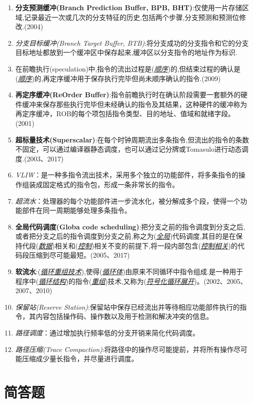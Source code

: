 \documentclass[a4paper]{ctexbook}
\newcommand{\blank}[1]{(\emph{\underline{#1}})}
\begin{document}
\begin{enumerate}
  \item \textbf{分支预测缓冲(Branch Prediction Buffer, BPB, BHT)}:仅使用一片存储区域,记录最近一次或几次的分支特征的历史,包括两个步骤,分支预测和预测位修改.(2004)
  \item \emph{分支目标缓冲(Branch Target Buffer, BTB)}:将分支成功的分支指令和它的分支目标地址都放到一个缓冲区中保存起来,缓冲区以分支指令的地址作为标识.
  \item 在前瞻执行(speculation)中,指令的流出过程是\blank{顺序}的,但结束过程的确认是\blank{顺序}的,再定序缓冲用于保存执行完毕但尚未顺序确认的指令.(2009)
  \item \textbf{再定序缓冲(ReOrder Buffer)}:指令前瞻执行时在确认阶段需要一套额外的硬件缓冲来保存那些执行完毕但未经确认的指令及其结果，这种硬件的缓冲称为再定序缓冲，ROB的每个项包括指令类型、目的地址、值域和就绪字段。(2001)
  \item \textbf{超标量技术(Superscalar)}:在每个时钟周期流出多条指令,但流出的指令的条数不固定，可以通过编译器静态调度，也可以通过记分牌或Tomasulo进行动态调度.(2003、2017)
  \item \emph{VLIW}：是一种多指令流出技术，采用多个独立的功能部件，将多条指令的操作组装成固定格式的指令包，形成一条非常长的指令。
  \item \emph{超流水}：处理器的每个功能部件进一步流水化，被分解成多个段，使得一个功能部件在同一周期能够处理多条指令。
  \item \textbf{全局代码调度(Globa code scheduling)}:把分支之前的指令调度到分支之后,或者把分支之后的指令调度到分支之前,称之为(\emph{\underline{全局}})代码调度,其目的是在保持代段\blank{数据}相关和\blank{控制}相关不变的前提下,将一段内部包含\blank{控制相关}的代码段压缩到尽可能最短。(2005、2017)
  \item \textbf{软流水}:\blank{循环重组技术},使得\blank{循环体}由原来不同循环中指令组成.是一种用于程序中\blank{循环结构}的指令\blank{重组}技术,又称为\blank{符号化循环展开}。(2002、2005、2007、2010)
  \item \emph{保留站(Reserve Station)}:保留站中保存已经流出并等待相应功能部件执行的指令，其内容包括操作码、操作数以及用于检测和解决冲突的信息。
  \item \emph{路径调度}：通过增加执行频率低的分支开销来简化代码调度。
  \item \emph{路径压缩(Trace Compaction)}:将路径中的操作尽可能提前，并将所有操作尽可能压缩成少量长指令，并尽量进行调度。
\end{enumerate}
\section{简答题}
\end{document}
